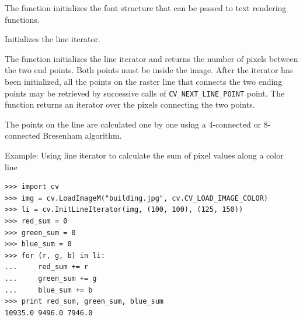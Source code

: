 The function initializes the font structure that can be passed to text rendering functions.


Initializes the line iterator.


\begin{description}
\end{description}

\ifC
The function initializes the line
iterator and returns the number of pixels between the two end points.
Both points must be inside the image.
After the iterator has been
initialized, all the points on the raster line that connects the
two ending points may be retrieved by successive calls of
\texttt{CV\_NEXT\_LINE\_POINT} point.
\fi
\ifPy
The function returns an iterator over the pixels connecting the two points.
\fi

The points on the line are
calculated one by one using a 4-connected or 8-connected Bresenham
algorithm.

\ifPy
Example: Using line iterator to calculate the sum of pixel values along a color line

\begin{lstlisting}
>>> import cv
>>> img = cv.LoadImageM("building.jpg", cv.CV_LOAD_IMAGE_COLOR)
>>> li = cv.InitLineIterator(img, (100, 100), (125, 150))
>>> red_sum = 0
>>> green_sum = 0
>>> blue_sum = 0
>>> for (r, g, b) in li:
...     red_sum += r
...     green_sum += g
...     blue_sum += b
>>> print red_sum, green_sum, blue_sum
10935.0 9496.0 7946.0
\end{lstlisting}

